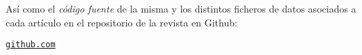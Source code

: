 \begin{textblock}{20}
{\begin{minipage}{.45\linewidth}
{{Así como el {\em código fuente} de la misma y los distintos ficheros de datos asociados a cada artículo en el repositorio de la revista en Github:\\

\begin{center}
	
{\tt \href{https://github.com/GLUD/GLUD_Magazine/}{github.com}}
\end{center}

}}

\bigskip

\end{minipage}
}


\end{textblock}

\pagebreak